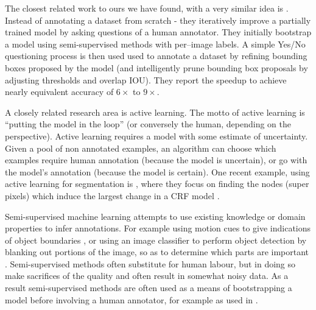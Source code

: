 The closest related work to ours we have found, with a very similar idea is \cite{Papadopoulos2016}. Instead of annotating a dataset from scratch - they iteratively improve a partially trained model by asking questions of a human annotator. They initially bootstrap a model using semi-supervised methods with per--image labels. A simple Yes/No questioning process is then used used to annotate a dataset by refining bounding boxes proposed by the model (and intelligently prune bounding box proposals by adjusting thresholds and overlap \gls{IOU}). They report the speedup to achieve nearly equivalent accuracy of $6\times$ to $9\times$.

A closely related research area is active learning. The motto of active learning is ``putting the model in the loop'' (or conversely the human, depending on the perspective). Active learning requires a model with some estimate of uncertainty. Given a pool of non annotated examples, an algorithm can choose which examples require human annotation (because the model is uncertain), or go with the model's annotation (because the model is certain). One recent example, using active learning for segmentation is \cite{Xu2017}, where they focus on finding the nodes (super pixels) which induce the largest change in a \gls{CRF} model .

Semi-supervised machine learning attempts to use existing knowledge or domain properties to infer annotations. For example using motion cues to give indications of object boundaries \cite{Hong2017}, or using an image classifier to perform object detection by blanking out portions of the image, so as to determine which parts are important \cite{Bazzani2016}. Semi-supervised methods often substitute for human labour, but in doing so make sacrifices of the quality and often result in somewhat noisy data. As a result semi-supervised methods are often used as a means of bootstrapping a model before involving a human annotator, for example as used in \cite{Papadopoulos2016}.



